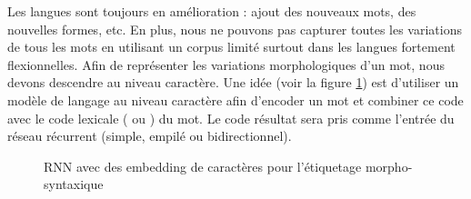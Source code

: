 \documentclass{KodeBook}
\begin{document}
Les langues sont toujours en amélioration : ajout des nouveaux mots, des nouvelles formes, etc. 
En plus, nous ne pouvons pas capturer toutes les variations de tous les mots en utilisant un corpus limité surtout dans les langues fortement flexionnelles. 
Afin de représenter les variations morphologiques d'un mot, nous devons descendre au niveau caractère.
Une idée (voir la figure \ref{fig:pos-rnn4}) est d'utiliser un modèle de langage au niveau caractère afin d'encoder un mot et combiner ce code avec le code lexicale ( ou ) du mot. 
Le code résultat sera pris comme l'entrée du réseau récurrent (simple, empilé ou bidirectionnel).
\begin{figure}[ht]
	\centering
	\caption[Embedding de caractères pour l'étiquetage morpho-syntaxique]{RNN avec des embedding de caractères pour l'étiquetage morpho-syntaxique \cite{2019-jurafsky-martin}\label{fig:pos-rnn4}}
\end{figure}
\end{document}
